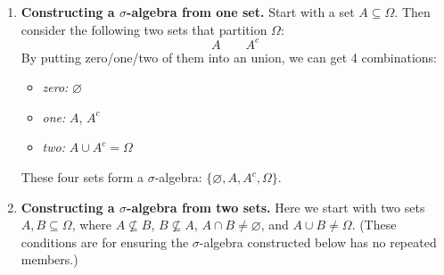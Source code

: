 \begin{enumerate}
\begin{itemize}
\end{itemize}

\item\label{it:construct-sig-alg-one} \textbf{Constructing a \(\sigma\)-algebra from one set.} Start with a set
\(A\subseteq \Omega\). Then consider the following two sets that partition
\(\Omega\):
\[
A\qquad A^c
\]
By putting zero/one/two of them into an union, we can get 4 combinations:
\begin{itemize}
\item \emph{zero:} \(\varnothing\)
\item \emph{one:} \(A\), \(A^c\)
\item \emph{two:} \(A\cup A^c=\Omega\)
\end{itemize}
These four sets form a \(\sigma\)-algebra: \(\{\varnothing, A, A^c, \Omega\}\).

\item\label{it:construct-sig-alg-two} \textbf{Constructing a \(\sigma\)-algebra
from two sets.} Here we start with two sets \(A,B\subseteq \Omega\), where
\(A\not\subseteq B\), \(B\not\subseteq A\), \(A\cap B\ne\varnothing\), and
\(A\cup B\ne\Omega\).  (These conditions are for ensuring the
\(\sigma\)-algebra constructed below has no repeated members.)


\end{enumerate}

